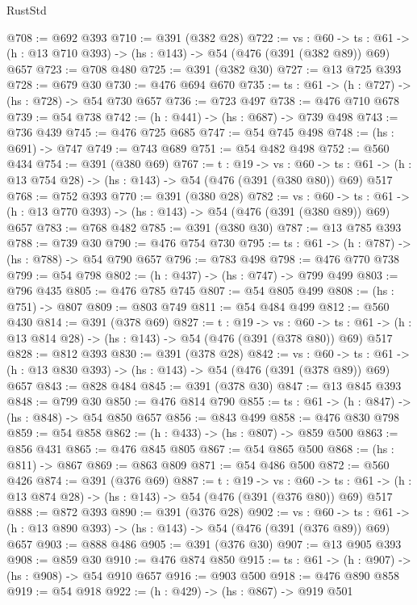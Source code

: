 \begin{lexlean}{RustStd}
\begin{coremodule}
@708 := @692 @393
@710 := @391 (@382 @28)
@722 := {vs : @60} ->
  {ts : @61} -> (h : @13 @710 @393) -> (hs : @143) -> @54 (@476 (@391 (@382 @89)) @69) @657
@723 := @708 @480
@725 := @391 (@382 @30)
@727 := @13 @725 @393
@728 := @679 @30
@730 := @476 @694 @670
@735 := {ts : @61} -> (h : @727) -> (hs : @728) -> @54 @730 @657
@736 := @723 @497
@738 := @476 @710 @678
@739 := @54 @738
@742 := (h : @441) -> (hs : @687) -> @739 @498
@743 := @736 @439
@745 := @476 @725 @685
@747 := @54 @745 @498
@748 := (hs : @691) -> @747
@749 := @743 @689
@751 := @54 @482 @498
@752 := @560 @434
@754 := @391 (@380 @69)
@767 := {t : @19} ->
  {vs : @60} ->
  {ts : @61} -> (h : @13 @754 @28) -> (hs : @143) -> @54 (@476 (@391 (@380 @80)) @69) @517
@768 := @752 @393
@770 := @391 (@380 @28)
@782 := {vs : @60} ->
  {ts : @61} -> (h : @13 @770 @393) -> (hs : @143) -> @54 (@476 (@391 (@380 @89)) @69) @657
@783 := @768 @482
@785 := @391 (@380 @30)
@787 := @13 @785 @393
@788 := @739 @30
@790 := @476 @754 @730
@795 := {ts : @61} -> (h : @787) -> (hs : @788) -> @54 @790 @657
@796 := @783 @498
@798 := @476 @770 @738
@799 := @54 @798
@802 := (h : @437) -> (hs : @747) -> @799 @499
@803 := @796 @435
@805 := @476 @785 @745
@807 := @54 @805 @499
@808 := (hs : @751) -> @807
@809 := @803 @749
@811 := @54 @484 @499
@812 := @560 @430
@814 := @391 (@378 @69)
@827 := {t : @19} ->
  {vs : @60} ->
  {ts : @61} -> (h : @13 @814 @28) -> (hs : @143) -> @54 (@476 (@391 (@378 @80)) @69) @517
@828 := @812 @393
@830 := @391 (@378 @28)
@842 := {vs : @60} ->
  {ts : @61} -> (h : @13 @830 @393) -> (hs : @143) -> @54 (@476 (@391 (@378 @89)) @69) @657
@843 := @828 @484
@845 := @391 (@378 @30)
@847 := @13 @845 @393
@848 := @799 @30
@850 := @476 @814 @790
@855 := {ts : @61} -> (h : @847) -> (hs : @848) -> @54 @850 @657
@856 := @843 @499
@858 := @476 @830 @798
@859 := @54 @858
@862 := (h : @433) -> (hs : @807) -> @859 @500
@863 := @856 @431
@865 := @476 @845 @805
@867 := @54 @865 @500
@868 := (hs : @811) -> @867
@869 := @863 @809
@871 := @54 @486 @500
@872 := @560 @426
@874 := @391 (@376 @69)
@887 := {t : @19} ->
  {vs : @60} ->
  {ts : @61} -> (h : @13 @874 @28) -> (hs : @143) -> @54 (@476 (@391 (@376 @80)) @69) @517
@888 := @872 @393
@890 := @391 (@376 @28)
@902 := {vs : @60} ->
  {ts : @61} -> (h : @13 @890 @393) -> (hs : @143) -> @54 (@476 (@391 (@376 @89)) @69) @657
@903 := @888 @486
@905 := @391 (@376 @30)
@907 := @13 @905 @393
@908 := @859 @30
@910 := @476 @874 @850
@915 := {ts : @61} -> (h : @907) -> (hs : @908) -> @54 @910 @657
@916 := @903 @500
@918 := @476 @890 @858
@919 := @54 @918
@922 := (h : @429) -> (hs : @867) -> @919 @501

\end{coremodule}
\end{lexlean}
